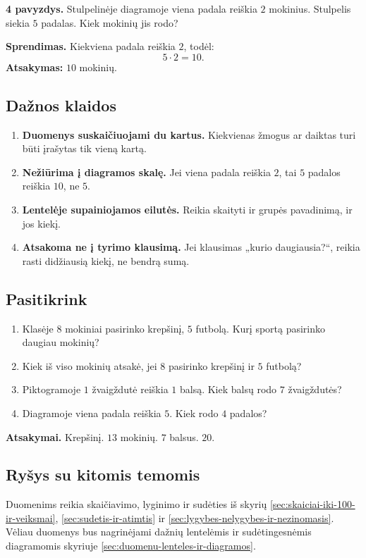 \textbf{4 pavyzdys.} Stulpelinėje diagramoje viena padala reiškia \(2\) mokinius. Stulpelis siekia \(5\) padalas. Kiek mokinių jis rodo?

\textbf{Sprendimas.} Kiekviena padala reiškia \(2\), todėl:
\[
5\cdot 2=10.
\]
\textbf{Atsakymas:} \(10\) mokinių.

\subsection{Dažnos klaidos}

\begin{enumerate}
\item \textbf{Duomenys suskaičiuojami du kartus.} Kiekvienas žmogus ar daiktas turi būti įrašytas tik vieną kartą.
\item \textbf{Nežiūrima į diagramos skalę.} Jei viena padala reiškia \(2\), tai \(5\) padalos reiškia \(10\), ne \(5\).
\item \textbf{Lentelėje supainiojamos eilutės.} Reikia skaityti ir grupės pavadinimą, ir jos kiekį.
\item \textbf{Atsakoma ne į tyrimo klausimą.} Jei klausimas „kurio daugiausia?“, reikia rasti didžiausią kiekį, ne bendrą sumą.
\end{enumerate}

\subsection{Pasitikrink}

\begin{enumerate}
\item Klasėje \(8\) mokiniai pasirinko krepšinį, \(5\) futbolą. Kurį sportą pasirinko daugiau mokinių?
\item Kiek iš viso mokinių atsakė, jei \(8\) pasirinko krepšinį ir \(5\) futbolą?
\item Piktogramoje \(1\) žvaigždutė reiškia \(1\) balsą. Kiek balsų rodo \(7\) žvaigždutės?
\item Diagramoje viena padala reiškia \(5\). Kiek rodo \(4\) padalos?
\end{enumerate}

\textbf{Atsakymai.} Krepšinį. \(13\) mokinių. \(7\) balsus. \(20\).

\subsection{Ryšys su kitomis temomis}

Duomenims reikia skaičiavimo, lyginimo ir sudėties iš skyrių \ref{sec:skaiciai-iki-100-ir-veiksmai}, \ref{sec:sudetis-ir-atimtis} ir \ref{sec:lygybes-nelygybes-ir-nezinomasis}. Vėliau duomenys bus nagrinėjami dažnių lentelėmis ir sudėtingesnėmis diagramomis skyriuje \ref{sec:duomenu-lenteles-ir-diagramos}.

